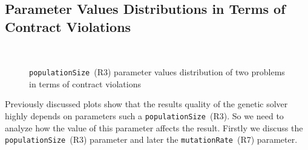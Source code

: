 \subsection{Parameter Values Distributions in Terms of Contract Violations}

\begin{figure}
	\\
	
	\caption[\texttt{populationSize}~(R3) parameter values distribution of two problems in terms of contract violations]{\texttt{populationSize}~(R3) parameter values distribution of two problems in terms of contract violations}
	\label{fig:populationSize_gradient}
\end{figure}



Previously discussed plots show that the results quality of the genetic solver highly depends on parameters such a \texttt{populationSize}~(R3). So we need to analyze how the value of this parameter affects the result. Firstly we discuss the \texttt{populationSize}~(R3) parameter and later the \texttt{mutationRate}~(R7) parameter.

